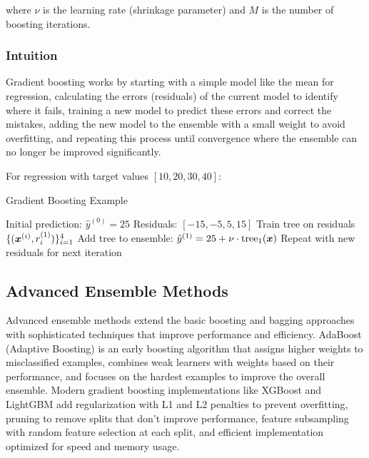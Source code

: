 where $\nu$ is the learning rate (shrinkage parameter) and $M$ is the number of boosting iterations.

\subsubsection{Intuition}

Gradient boosting works by starting with a simple model like the mean for regression, calculating the errors (residuals) of the current model to identify where it fails, training a new model to predict these errors and correct the mistakes, adding the new model to the ensemble with a small weight to avoid overfitting, and repeating this process until convergence where the ensemble can no longer be improved significantly.

\begin{example}
For regression with target values $[10, 20, 30, 40]$:

\begin{algorithm}[htbp]
\caption{Gradient Boosting Example}
\label{alg:gradient-boosting-example}
\begin{algorithmic}[1]
\State Initial prediction: $\hat{y}^{(0)} = 25$ 
\State Residuals: $[-15, -5, 5, 15]$ 
\State Train tree on residuals $\{(\boldsymbol{x}^{(i)}, r_i^{(1)})\}_{i=1}^{4}$
\State Add tree to ensemble: $\hat{y}^{(1)} = 25 + \nu \cdot \text{tree}_1(\boldsymbol{x})$
\State Repeat with new residuals for next iteration
\end{algorithmic}
\end{algorithm}
\end{example}

\subsection{Advanced Ensemble Methods}

Advanced ensemble methods extend the basic boosting and bagging approaches with sophisticated techniques that improve performance and efficiency. AdaBoost (Adaptive Boosting) is an early boosting algorithm that assigns higher weights to misclassified examples, combines weak learners with weights based on their performance, and focuses on the hardest examples to improve the overall ensemble. Modern gradient boosting implementations like XGBoost and LightGBM add regularization with L1 and L2 penalties to prevent overfitting, pruning to remove splits that don't improve performance, feature subsampling with random feature selection at each split, and efficient implementation optimized for speed and memory usage.

